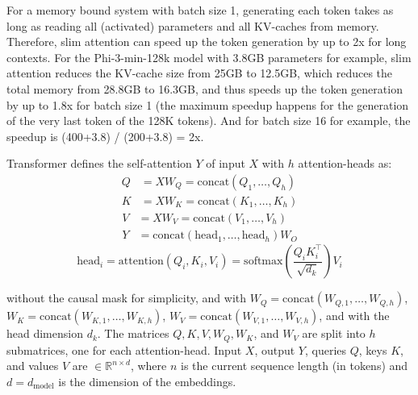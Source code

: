 \documentclass{article}
\newcommand{\eR}[2]{$\in \mathbb{R}^{#1 \times #2}$} %
\begin{document}
For a memory bound system with batch size 1, generating each token takes as long as reading all (activated) parameters and all KV-caches from memory. Therefore, slim attention can speed up the token generation by up to 2x for long contexts. For the Phi-3-min-128k model with 3.8GB parameters for example, slim attention reduces the KV-cache size from 25GB to 12.5GB, which reduces the total memory from 28.8GB to 16.3GB, and thus speeds up the token generation by up to 1.8x for batch size 1 (the maximum speedup happens for the generation of the very last token of the 128K tokens). And for batch size 16 for example, the speedup is (400+3.8) / (200+3.8) = 2x.

Transformer \citep{vanilla} defines the self-attention $Y$ of input $X$ with $h$ attention-heads as:
\begin{equation} \begin{aligned}
  Q &= X W_Q = \text{concat} \left( Q_1, \ldots, Q_h \right) \\
  K &= X W_K = \text{concat} \left( K_1, \ldots, K_h \right)
\end{aligned} \label{eq4} \end{equation}
\begin{equation} \begin{aligned}
  V &= X W_V = \text{concat} \left( V_1, \ldots, V_h \right) \\
  Y &= \text{concat} \left( \text{head}_1, \ldots, \text{head}_h \right) W_O
\end{aligned} \label{eq5} \end{equation}
\begin{equation}
  \text{head}_i = \text{attention} \left( Q_i, K_i, V_i \right) = \text{softmax} \left( \frac{Q_i K_i^\top}{\sqrt{d_k}} \right) V_i \label{eq2}
\end{equation}

without the causal mask for simplicity, and with $W_Q = \text{concat}(W_{Q,1}, \ldots, W_{Q,h})$, $W_K = \text{concat}(W_{K,1}, \ldots, W_{K,h})$, $W_V = \text{concat}(W_{V,1}, \ldots, W_{V,h})$, and with the head dimension $d_k$. The matrices $Q, K, V, W_Q, W_K$, and $W_V$ are split into $h$ submatrices, one for each attention-head. Input $X$, output $Y$, queries $Q$, keys $K$, and values $V$ are \eR{n}{d}, where $n$ is the current sequence length (in tokens) and $d = d_{\text{model}}$ is the dimension of the embeddings.
\end{document}
